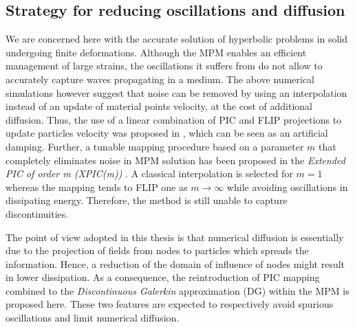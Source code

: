  
\subsection{Strategy for reducing oscillations and diffusion}
We are concerned here with the accurate solution of hyperbolic problems in solid undergoing finite deformations. Although the MPM enables an efficient management of large strains, the oscillations it suffers from do not allow to accurately capture waves propagating in a medium. The above numerical simulations however suggest that noise can be removed by using an interpolation instead of an update of material points velocity, at the cost of additional diffusion. Thus, the use of  a linear combination of PIC and FLIP projections to update particles velocity was proposed in \cite{Nairn}, which can be seen as an artificial damping. Further, a tunable mapping procedure based on a parameter $m$ that completely eliminates noise in MPM solution has been proposed in the \textit{Extended PIC of order m (XPIC(m))} \cite{XPIC}. A classical interpolation is selected for $m=1$ whereas the mapping tends to FLIP one as $m \rightarrow \infty$ while avoiding oscillations in dissipating energy. Therefore, the method is still unable to capture discontinuities.

The point of view adopted in this thesis is that numerical diffusion is essentially due to the projection of fields from nodes to particles which spreads the information. Hence, a reduction of the domain of influence of nodes might result in lower dissipation. As a consequence, the reintroduction of PIC mapping combined to the \textit{Discontinuous Galerkin} approximation (DG) within the MPM is proposed here. These two features are expected to respectively avoid spurious oscillations and limit numerical diffusion.


